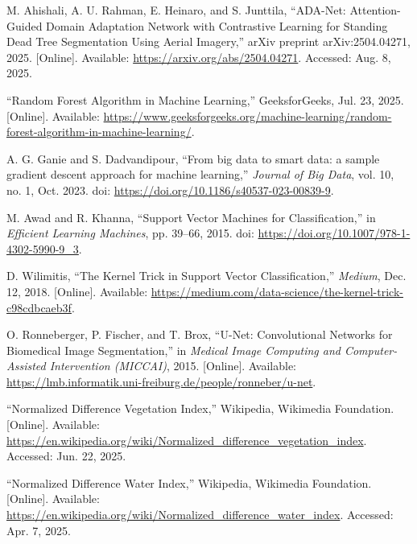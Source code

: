 \begin{thebibliography}{00}
 M. Ahishali, A. U. Rahman, E. Heinaro, and S. Junttila, ``ADA-Net: Attention-Guided Domain Adaptation Network with Contrastive Learning for Standing Dead Tree Segmentation Using Aerial Imagery,'' arXiv preprint arXiv:2504.04271, 2025. [Online]. Available: \url{https://arxiv.org/abs/2504.04271}. Accessed: Aug. 8, 2025.

 ``Random Forest Algorithm in Machine Learning,'' GeeksforGeeks, Jul. 23, 2025. [Online]. Available: \url{https://www.geeksforgeeks.org/machine-learning/random-forest-algorithm-in-machine-learning/}.

 A. G. Ganie and S. Dadvandipour, ``From big data to smart data: a sample gradient descent approach for machine learning,'' \textit{Journal of Big Data}, vol. 10, no. 1, Oct. 2023. doi: \url{https://doi.org/10.1186/s40537-023-00839-9}.

 M. Awad and R. Khanna, ``Support Vector Machines for Classification,'' in \textit{Efficient Learning Machines}, pp. 39--66, 2015. doi: \url{https://doi.org/10.1007/978-1-4302-5990-9_3}.

 D. Wilimitis, ``The Kernel Trick in Support Vector Classification,'' \textit{Medium}, Dec. 12, 2018. [Online]. Available: \url{https://medium.com/data-science/the-kernel-trick-c98cdbcaeb3f}.

 O. Ronneberger, P. Fischer, and T. Brox, ``U-Net: Convolutional Networks for Biomedical Image Segmentation,'' in \textit{Medical Image Computing and Computer-Assisted Intervention (MICCAI)}, 2015. [Online]. Available: \url{https://lmb.informatik.uni-freiburg.de/people/ronneber/u-net}.

 ``Normalized Difference Vegetation Index,'' Wikipedia, Wikimedia Foundation. [Online]. Available: \url{https://en.wikipedia.org/wiki/Normalized_difference_vegetation_index}. Accessed: Jun. 22, 2025.

 ``Normalized Difference Water Index,'' Wikipedia, Wikimedia Foundation. [Online]. Available: \url{https://en.wikipedia.org/wiki/Normalized_difference_water_index}. Accessed: Apr. 7, 2025.


\end{thebibliography}
